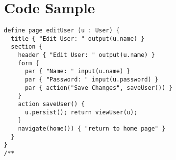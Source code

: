 \chapter{Code Sample}

\begin{verbatim}
define page editUser (u : User) {
  title { "Edit User: " output(u.name) }
  section {
    header { "Edit User: " output(u.name) }
    form {
      par { "Name: " input(u.name) }
      par { "Password: " input(u.password) }
      par { action("Save Changes", saveUser()) }
    }
    action saveUser() {
      u.persist(); return viewUser(u);
    }
    navigate(home()) { "return to home page" }
  }
}
/**\end{verbatim}
